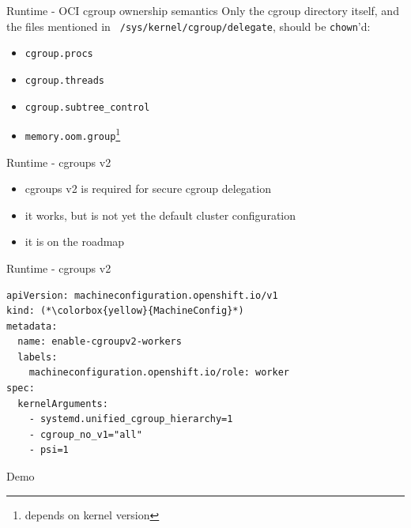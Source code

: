 \documentclass[ignorenonframetext,aspectratio=169,12pt]{beamer}
\begin{document}
\begin{frame}{Runtime - OCI cgroup ownership semantics}
\protect\hypertarget{openshift-cgroup-ownership-semantics-files}{}
Only the cgroup directory itself, and the files mentioned in {\tt
/sys/kernel/cgroup/delegate}, should be {\tt chown}'d:

\begin{itemize}
\item {\tt cgroup.procs}
\item {\tt cgroup.threads}
\item {\tt cgroup.subtree\_control}
\item {\tt memory.oom.group}\footnote{depends on kernel version}
\end{itemize}

\end{frame}


\begin{frame}{Runtime - cgroups v2}
\protect\hypertarget{openshift-cgroups-v2}{}
\begin{itemize}
\item cgroups v2 is required for secure cgroup delegation
\item it works, but is not yet the default cluster configuration
\item it is on the roadmap
\end{itemize}
\end{frame}

\begin{frame}[fragile]{Runtime - cgroups v2}
\protect\hypertarget{openshift-cgroups-v2-machineconfig}{}
\begin{lstlisting}
apiVersion: machineconfiguration.openshift.io/v1
kind: (*\colorbox{yellow}{MachineConfig}*)
metadata:
  name: enable-cgroupv2-workers
  labels:
    machineconfiguration.openshift.io/role: worker
spec:
  kernelArguments:
    - systemd.unified_cgroup_hierarchy=1
    - cgroup_no_v1="all"
    - psi=1
\end{lstlisting}
\end{frame}

\begin{frame}[plain]
\centering
\huge Demo
\end{frame}
\end{document}
